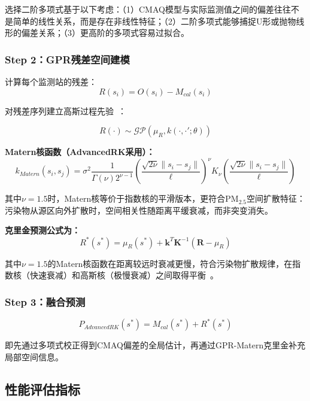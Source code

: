 \documentclass[UTF8, a4paper, 12pt]{article}
\begin{document}
选择二阶多项式基于以下考虑：（1）CMAQ模型与实际监测值之间的偏差往往不是简单的线性关系，而是存在非线性特征；（2）二阶多项式能够捕捉U形或抛物线形的偏差关系；（3）更高阶的多项式容易过拟合。

\subsubsection{Step 2：GPR残差空间建模}

计算每个监测站的残差：
\begin{equation}
R(s_i) = O(s_i) - M_{cal}(s_i)
\end{equation}

对残差序列建立高斯过程先验~\cite{rasmussen2006gaussian}：

\begin{equation}
R(\cdot) \sim \mathcal{GP}(\mu_R, k(\cdot, \cdot'; \theta))
\end{equation}

\textbf{Matern核函数（AdvancedRK采用）：}
\begin{equation}
k_{Matern}(s_i, s_j) = \sigma^2 \frac{1}{\Gamma(\nu)2^{\nu-1}} \left(\frac{\sqrt{2\nu}\|s_i - s_j\|}{\ell}\right)^\nu K_\nu\left(\frac{\sqrt{2\nu}\|s_i - s_j\|}{\ell}\right)
\end{equation}

其中$\nu=1.5$时，Matern核等价于指数核的平滑版本，更符合PM$_{2.5}$空间扩散特征：污染物从源区向外扩散时，空间相关性随距离平缓衰减，而非突变消失。

\textbf{克里金预测公式为：}
\begin{equation}
R^*(s^*) = \mu_R(s^*) + \mathbf{k}^T \mathbf{K}^{-1} (\mathbf{R} - \mu_R)
\end{equation}

其中$\nu=1.5$的Matern核函数在距离较远时衰减更慢，符合污染物扩散规律，在指数核（快速衰减）和高斯核（极慢衰减）之间取得平衡~\cite{rasmussen2006gaussian}。

\subsubsection{Step 3：融合预测}
\begin{equation}
P_{AdvancedRK}(s^*) = M_{cal}(s^*) + R^*(s^*)
\end{equation}

即先通过多项式校正得到CMAQ偏差的全局估计，再通过GPR-Matern克里金补充局部空间信息。

\subsection{性能评估指标}
\end{document}
